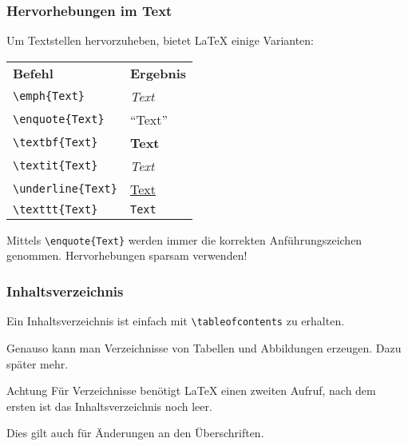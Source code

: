 \begin{frame}[fragile]
    \frametitle{Hervorhebungen im Text}
    
    Um Textstellen hervorzuheben, bietet \LaTeX{} einige Varianten:
    \medskip
    \begin{center}
        \begin{tabular}{ll}
            \textbf{Befehl} & \textbf{Ergebnis}\\
            \verb+\emph{Text}+ & \emph{Text}\\
            \verb+\enquote{Text}+ & \enquote{Text}\\
            \verb+\textbf{Text}+ & \textbf{Text}\\
            \verb+\textit{Text}+ & \textit{Text}\\
            \verb+\underline{Text}+ & \underline{Text}\\
            \verb+\texttt{Text}+ & \texttt{Text}
        \end{tabular}
    \end{center}
    \medskip
    Mittels \verb+\enquote{Text}+ werden immer die korrekten Anführungszeichen genommen. Hervorhebungen sparsam verwenden!
\end{frame}


\begin{frame}[fragile]
    \frametitle{Inhaltsverzeichnis}
    Ein Inhaltsverzeichnis ist einfach mit \verb+\tableofcontents+ zu erhalten.
    
    \bigskip
    Genauso kann man Verzeichnisse von Tabellen und Abbildungen erzeugen. Dazu später mehr.
    
    \medskip
    \begin{alertblock}{Achtung}
        Für Verzeichnisse benötigt \LaTeX{} einen zweiten Aufruf, nach dem ersten ist das Inhaltsverzeichnis noch leer.
    
        \smallskip
        Dies gilt auch für Änderungen an den Überschriften.
    \end{alertblock}
\end{frame}


